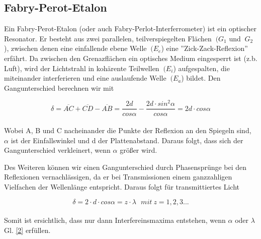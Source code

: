 \documentclass{article}
\begin{document}
\subsection{Fabry-Perot-Etalon}
Ein Fabry-Perot-Etalon (oder auch Fabry-Perlot-Interferrometer) ist ein optischer Resonator. Er besteht aus zwei parallelen, teilverspiegelten Flächen \(\ (G_{1} \) und \(\ G_{2} \)), zwischen denen eine einfallende ebene Welle \(\ (E_{e} \)) eine ''Zick-Zack-Reflexion'' erfährt. Da zwischen den Grenazflächen ein optisches Medium eingesperrt ist (z.b. Luft), wird der Lichtstrahl in kohärente Teilwellen \(\ (E_{i} \)) aufgespalten, die miteinander interferieren und eine auslaufende Welle \(\ (E_{a} \)) bildet. Den Gangunterschied berechnen wir mit

\begin{equation}
\label{1}
\delta = \overline{AC} + \overline{CD} - \overline{AB}= \frac{2d}{cos \alpha}- \frac {2d \cdot sin^2 \alpha}{cos \alpha} =2d\cdot cos \alpha
\end{equation}\\

Wobei A, B und C nacheinander die Punkte der Reflexion an den Spiegeln sind, \(\alpha \) ist der Einfallswinkel und d der Plattenabstand. Daraus folgt, dass sich der Gangunterschied verkleinert, wenn \(\alpha \) größer wird.

Des Weiteren können wir einen Gangunterschied durch Phasensprünge bei den Reflexionen vernachlässigen, da er bei Transmissionen einem ganzzahligen Vielfachen der Wellenlänge entspricht. Daraus folgt für transmittiertes Licht

\begin{equation}
\label{2}
\delta = 2 \cdot d \cdot cos \alpha = z \cdot \lambda \ \ \ mit\ z=1,2,3...
\end{equation}\\

Somit ist ersichtlich, dass nur dann Interfereinsmaxima entstehen, wenn \(\alpha \) oder \(\lambda \) Gl. \eqref{2} erfüllen.

\begin{center}
\begin{minipage}{\linewidth}
\centering
{}
%
\label{interferometer}
\end{minipage}
\end{center}
\end{document}
